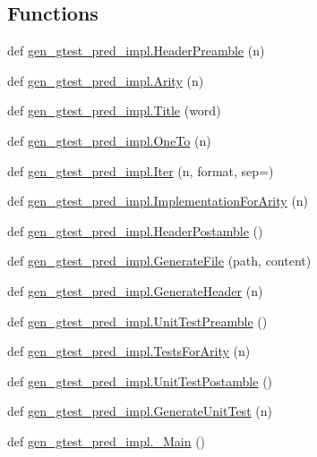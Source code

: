 \subsection*{Functions}
\begin{DoxyCompactItemize}
\item 
def \mbox{\hyperlink{namespacegen__gtest__pred__impl_a0b99cadcffab4bf161654a382163bac8}{gen\+\_\+gtest\+\_\+pred\+\_\+impl.\+Header\+Preamble}} (n)
\item 
def \mbox{\hyperlink{namespacegen__gtest__pred__impl_a5bbb7272f3588b969ab3ded6f49836a1}{gen\+\_\+gtest\+\_\+pred\+\_\+impl.\+Arity}} (n)
\item 
def \mbox{\hyperlink{namespacegen__gtest__pred__impl_ae49dd9bd9152dbcb3ca7994ce04c37ba}{gen\+\_\+gtest\+\_\+pred\+\_\+impl.\+Title}} (word)
\item 
def \mbox{\hyperlink{namespacegen__gtest__pred__impl_a7920598d51c9dded76a4ef9ffde339e4}{gen\+\_\+gtest\+\_\+pred\+\_\+impl.\+One\+To}} (n)
\item 
def \mbox{\hyperlink{namespacegen__gtest__pred__impl_ac016218b7c9437d1d5ac85c574c83069}{gen\+\_\+gtest\+\_\+pred\+\_\+impl.\+Iter}} (n, format, sep=\textquotesingle{}\textquotesingle{})
\item 
def \mbox{\hyperlink{namespacegen__gtest__pred__impl_a8c53b141b89f9c05d0131d9756dfeab0}{gen\+\_\+gtest\+\_\+pred\+\_\+impl.\+Implementation\+For\+Arity}} (n)
\item 
def \mbox{\hyperlink{namespacegen__gtest__pred__impl_a3d40c7ef70cf4d46e56c9612f34027bf}{gen\+\_\+gtest\+\_\+pred\+\_\+impl.\+Header\+Postamble}} ()
\item 
def \mbox{\hyperlink{namespacegen__gtest__pred__impl_a16210fe365dfd176e04aa2578ac5a8d9}{gen\+\_\+gtest\+\_\+pred\+\_\+impl.\+Generate\+File}} (path, content)
\item 
def \mbox{\hyperlink{namespacegen__gtest__pred__impl_a6f3039a82a5283846fb272f8a3af6743}{gen\+\_\+gtest\+\_\+pred\+\_\+impl.\+Generate\+Header}} (n)
\item 
def \mbox{\hyperlink{namespacegen__gtest__pred__impl_ae52dc86461d1b666c7b658a8c27c69f9}{gen\+\_\+gtest\+\_\+pred\+\_\+impl.\+Unit\+Test\+Preamble}} ()
\item 
def \mbox{\hyperlink{namespacegen__gtest__pred__impl_ab0da913fa15e5695d5bb2dd1de5dec57}{gen\+\_\+gtest\+\_\+pred\+\_\+impl.\+Tests\+For\+Arity}} (n)
\item 
def \mbox{\hyperlink{namespacegen__gtest__pred__impl_a57b922f50d0807896496dcd883c1f098}{gen\+\_\+gtest\+\_\+pred\+\_\+impl.\+Unit\+Test\+Postamble}} ()
\item 
def \mbox{\hyperlink{namespacegen__gtest__pred__impl_acbd42b5b7fb7ddbb06a4dd58fc37e9ed}{gen\+\_\+gtest\+\_\+pred\+\_\+impl.\+Generate\+Unit\+Test}} (n)
\item 
def \mbox{\hyperlink{namespacegen__gtest__pred__impl_a50dd74615a1507ce657c8fa24d7c161e}{gen\+\_\+gtest\+\_\+pred\+\_\+impl.\+\_\+\+Main}} ()
\end{DoxyCompactItemize}
